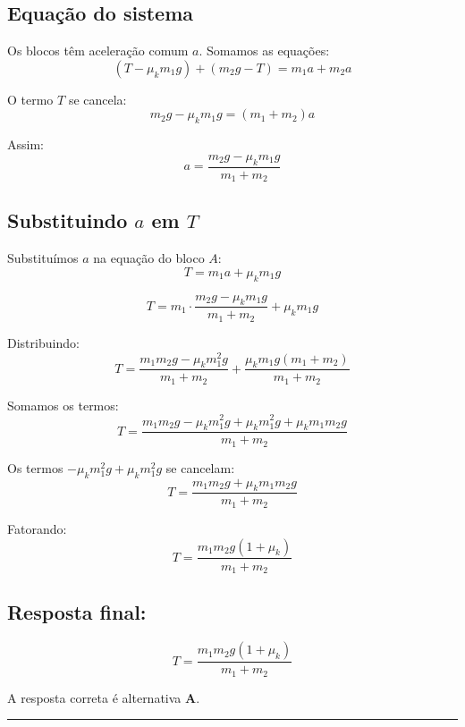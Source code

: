 \documentclass[a4paper,12pt]{article}
\begin{document}
\begin{flushleft}
\subsection*{Equação do sistema}

Os blocos têm aceleração comum \( a \). Somamos as equações:
\[
(T - \mu_k m_1 g) + (m_2 g - T) = m_1 a + m_2 a
\]

O termo \( T \) se cancela:
\[
m_2 g - \mu_k m_1 g = (m_1 + m_2) a
\]

Assim:
\[
\boxed{
a = \frac{m_2 g - \mu_k m_1 g}{m_1 + m_2}
}
\]

\subsection*{Substituindo \( a \) em \( T \)}

Substituímos \( a \) na equação do bloco \( A \):
\[
T = m_1 a + \mu_k m_1 g
\]

\[
T = m_1 \cdot \frac{m_2 g - \mu_k m_1 g}{m_1 + m_2} + \mu_k m_1 g
\]

Distribuindo:
\[
T = \frac{m_1 m_2 g - \mu_k m_1^2 g}{m_1 + m_2} + \frac{\mu_k m_1 g (m_1 + m_2)}{m_1 + m_2}
\]

Somamos os termos:
\[
T = \frac{m_1 m_2 g - \mu_k m_1^2 g + \mu_k m_1^2 g + \mu_k m_1 m_2 g}{m_1 + m_2}
\]

Os termos \( -\mu_k m_1^2 g + \mu_k m_1^2 g \) se cancelam:
\[
T = \frac{m_1 m_2 g + \mu_k m_1 m_2 g}{m_1 + m_2}
\]

Fatorando:
\[
T = \frac{m_1 m_2 g (1 + \mu_k)}{m_1 + m_2}
\]

\subsection*{Resposta final:}
\[
\boxed{
T = \frac{m_1 m_2 g (1 + \mu_k)}{m_1 + m_2}
}
\]

A resposta correta é alternativa \colorbox{green!50}{\textbf{A}}.


\end{flushleft}

\noindent\rule{\linewidth}{0.6pt}\\
\end{document}
